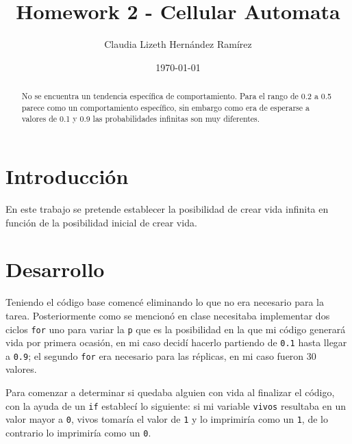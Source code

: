 \documentclass{article}
\author{Claudia Lizeth Hern\'andez Ram\'irez} %
\title{Homework 2 - Cellular Automata} %
\date{\today}
\begin{document}

\maketitle %

\begin{abstract} %
  \centering
  No se encuentra un tendencia espec\'ifica de comportamiento.
  Para el rango de 0.2 a 0.5 parece como un comportamiento espec\'ifico, sin embargo como era de esperarse a valores de 0.1 y 0.9 las probabilidades infinitas son muy diferentes.
\end{abstract}


\section{Introducci\'{o}n}\label{intro} %

En este trabajo se pretende establecer la posibilidad de crear vida infinita en funci\'on de la posibilidad inicial de crear vida. 




\section{Desarrollo}\label{desarrollo} %
Teniendo el c\'odigo base \cite{RepoDraElisa}comenc\'e eliminando lo que no era necesario para la tarea. Posteriormente como se mencion\'o en clase necesitaba implementar dos ciclos \texttt{for} uno para variar la \texttt{p} que es la posibilidad en la que mi c\'odigo generar\'a vida por primera ocasi\'on, en mi caso decid\'i hacerlo partiendo de \texttt{0.1} hasta llegar a \texttt{0.9}; el segundo \texttt{for} era necesario para las r\'eplicas, en mi caso fueron 30 valores.

Para comenzar a determinar si quedaba alguien con vida al finalizar el c\'odigo, con la ayuda de un \texttt{if} establec\'i lo siguiente:
si mi variable \texttt{vivos} resultaba en un valor mayor a \texttt{0}, vivos tomar\'ia el valor de \texttt{1} y lo imprimir\'ia como un \texttt{1}, de lo contrario lo imprimir\'ia como un \texttt{0}.
\end{document}
